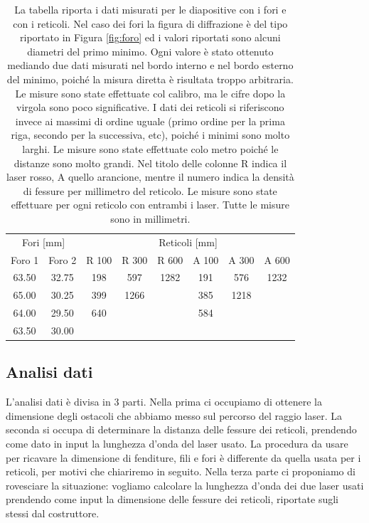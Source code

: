 \begin{table}[b!]
    \centering
    \footnotesize
    \begin{tabular}{c c | c c c | c c c}
        \toprule
        \multicolumn{2}{c|}{Fori [mm]} & \multicolumn{6}{c}{Reticoli [mm]} \\[1mm]
        Foro 1 &      Foro 2 & R 100 &   R 300 &   R 600 & A 100 & A 300 & A 600\\
        \midrule
        63.50 &           32.75      & 198   &   597   &   1282  & 191   & 576   & 1232 \\
        65.00 &           30.25      & 399   &   1266  &         & 385   & 1218  &      \\
        64.00 &           29.50      & 640   &         &         & 584   &       &      \\
        63.50 &           30.00      &       &         &         &       &       &      \\
        \bottomrule
    \end{tabular}
    \caption{La tabella riporta i dati misurati per le diapositive con i fori e con i reticoli.
        Nel caso dei fori la figura di diffrazione è del tipo riportato in Figura \ref{fig:foro}
        ed i valori riportati sono alcuni diametri del primo minimo. Ogni valore è stato ottenuto mediando
        due dati misurati nel bordo interno e nel bordo esterno del minimo, poiché la misura diretta è risultata
        troppo arbitraria. Le misure sono state effettuate col calibro, ma le cifre dopo la virgola sono poco significative.
        I dati dei reticoli si riferiscono invece ai massimi di ordine uguale
        (primo ordine per la prima riga, secondo per la successiva, etc), poiché i minimi sono molto larghi.
        Le misure sono state effettuate colo metro poiché le distanze sono molto grandi. Nel titolo delle colonne R indica il laser
        rosso, A quello arancione, mentre il numero indica la densità di fessure per millimetro del reticolo. Le misure
        sono state effettuare per ogni reticolo con entrambi i laser. Tutte le misure sono in millimetri.}
    \label{tab:foret}
\end{table}

\subsection{Analisi dati}

L'analisi dati è divisa in 3 parti. Nella prima ci occupiamo di ottenere la dimensione degli ostacoli
che abbiamo messo sul percorso del raggio laser. La seconda si occupa di determinare la distanza
delle fessure dei reticoli, prendendo come dato in input la lunghezza d'onda del laser usato.
La procedura da usare per ricavare la dimensione di fenditure, fili e fori è differente da quella usata
per i reticoli, per motivi che chiariremo in seguito.
Nella terza parte ci proponiamo di rovesciare la situazione: vogliamo calcolare la lunghezza d'onda dei due
laser usati prendendo come input la dimensione delle fessure dei reticoli, riportate sugli stessi dal costruttore.

